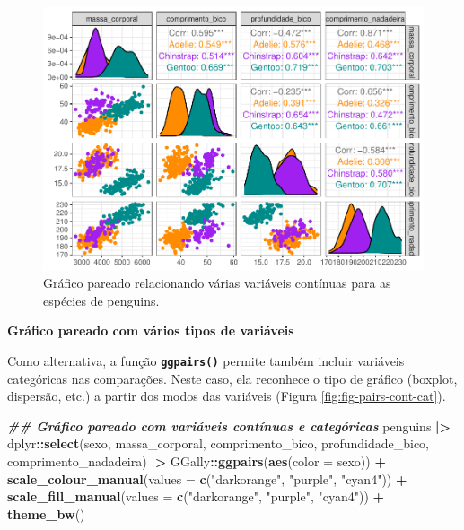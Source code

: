 \documentclass[
]{article}
\newenvironment{Shaded}{\begin{snugshade}}{\end{snugshade}}
\newcommand{\AttributeTok}[1]{\textcolor[rgb]{0.13,0.29,0.53}{#1}}
\newcommand{\DocumentationTok}[1]{\textcolor[rgb]{0.56,0.35,0.01}{\textbf{\textit{#1}}}}
\newcommand{\FunctionTok}[1]{\textcolor[rgb]{0.13,0.29,0.53}{\textbf{#1}}}
\newcommand{\NormalTok}[1]{#1}
\newcommand{\SpecialCharTok}[1]{\textcolor[rgb]{0.81,0.36,0.00}{\textbf{#1}}}
\newcommand{\StringTok}[1]{\textcolor[rgb]{0.31,0.60,0.02}{#1}}
\begin{document}
\begin{figure}
\centering
\includegraphics{epr_files/figure-latex/fig-pairs-cont-1.pdf}
\caption{\label{fig:fig-pairs-cont}Gráfico pareado relacionando várias variáveis contínuas para as espécies de penguins.}
\end{figure}

\textbf{Gráfico pareado com vários tipos de variáveis}

Como alternativa, a função \textbf{\texttt{ggpairs()}} permite também incluir variáveis categóricas nas comparações. Neste caso, ela reconhece o tipo de gráfico (boxplot, dispersão, etc.) a partir dos modos das variáveis (Figura \ref{fig:fig-pairs-cont-cat}).

\begin{Shaded}
\begin{Highlighting}[]
\DocumentationTok{\#\# Gráfico pareado com variáveis contínuas e categóricas}
\NormalTok{penguins }\SpecialCharTok{|\textgreater{}}
\NormalTok{    dplyr}\SpecialCharTok{::}\FunctionTok{select}\NormalTok{(sexo, massa\_corporal, comprimento\_bico, profundidade\_bico, comprimento\_nadadeira) }\SpecialCharTok{|\textgreater{}}
\NormalTok{    GGally}\SpecialCharTok{::}\FunctionTok{ggpairs}\NormalTok{(}\FunctionTok{aes}\NormalTok{(}\AttributeTok{color =}\NormalTok{ sexo)) }\SpecialCharTok{+}
    \FunctionTok{scale\_colour\_manual}\NormalTok{(}\AttributeTok{values =} \FunctionTok{c}\NormalTok{(}\StringTok{"darkorange"}\NormalTok{, }\StringTok{"purple"}\NormalTok{, }\StringTok{"cyan4"}\NormalTok{)) }\SpecialCharTok{+}
    \FunctionTok{scale\_fill\_manual}\NormalTok{(}\AttributeTok{values =} \FunctionTok{c}\NormalTok{(}\StringTok{"darkorange"}\NormalTok{, }\StringTok{"purple"}\NormalTok{, }\StringTok{"cyan4"}\NormalTok{)) }\SpecialCharTok{+}
    \FunctionTok{theme\_bw}\NormalTok{()}
\end{Highlighting}
\end{Shaded}
\end{document}
